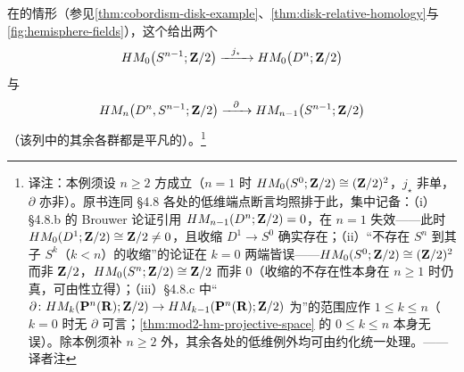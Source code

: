 \begin{example}\label{thm:les-disk-case}
在\trDisk{}的情形（参见\cref{thm:cobordism-disk-example}、\cref{thm:disk-relative-homology}与\cref{fig:hemisphere-fields}），这个\trLongExactSequence{}给出两个\trIsomorphism
\[
HM_0\bigl(S^{n-1};\ZZ/2\bigr)\xrightarrow{\ \ j_\star\ \ }HM_0\bigl(D^n;\ZZ/2\bigr)
\]
与
\[
HM_n\bigl(D^n,S^{n-1};\ZZ/2\bigr)\xrightarrow{\ \ \partial\ \ }
  HM_{n-1}\bigl(S^{n-1};\ZZ/2\bigr)
\]
（该\trExact{}列中的其余各群都是平凡的）。\footnote{译注：本例须设 $n\ge 2$ 方成立（$n=1$ 时 $HM_0(S^0;\mathbf{Z}/2)\cong(\mathbf{Z}/2)^2$，$j_\star$ 非单，$\partial$ 亦非\trIsomorphism）。原书连同 §4.8 各处的低维端点断言均照排于此，集中记备：（i）§4.8.b 的 Brouwer 论证引用 $HM_{n-1}(D^n;\mathbf{Z}/2)=0$，在 $n=1$ 失效——此时 $HM_0(D^1;\mathbf{Z}/2)\cong\mathbf{Z}/2\neq 0$，且收缩 $D^1\to S^0$ 确实存在；（ii）“不存在 $S^n$ 到其子\trSphere{} $S^k$（$k<n$）的收缩”的\trHomology{}论证在 $k=0$ 两端皆误——$HM_0(S^0;\mathbf{Z}/2)\cong(\mathbf{Z}/2)^2$ 而非 $\mathbf{Z}/2$，$HM_0(S^n;\mathbf{Z}/2)\cong\mathbf{Z}/2$ 而非 $0$（收缩的不存在性本身在 $n\ge 1$ 时仍真，可由\trConnected{}性立得）；（iii）§4.8.c 中“\trConnectingHomomorphism{} $\partial\colon HM_k(\mathbf{P}^n(\mathbf{R});\mathbf{Z}/2)\to HM_{k-1}(\mathbf{P}^n(\mathbf{R});\mathbf{Z}/2)$ 为\trIsomorphism”的范围应作 $1\le k\le n$（$k=0$ 时无 $\partial$ 可言；\cref{thm:mod2-hm-projective-space} 的 $0\le k\le n$ 本身无误）。除本例须补 $n\ge 2$ 外，其余各处的低维例外均可由约化\trHomology{}统一处理。——译者注}
\end{example}
